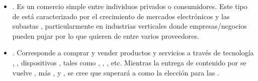 \begin{itemize}

	\item \textbf{\ctoc}. Es un comercio simple entre individuos privados o consumidores. Este tipo de \ecommerceCOM está caracterizado por el crecimiento de mercados electrónicos y las subastas \online, particularmente en industrias verticales donde empresas/negocios pueden pujar por lo que quieren de entre varios proveedores.

	\item \textbf{\mcommerce}. Corresponde a comprar y vender productos y servicios a través de tecnología \wirelessPC, \ieCPT, dispositivos \handheldPC, tales como \smartphonesCPT, \pdasCPT, \tabletsINT, etc. Mientras la entrega de contenido  por \devicesINT \wirelessPC se vuelve \fasterQA, más \secureQA, y \scalableQA, se cree que \mcommerce superará a \wirelinePC \ecommerceCOM como la elección para las \transactionsDB \commerceCOM.
	
\end{itemize}
